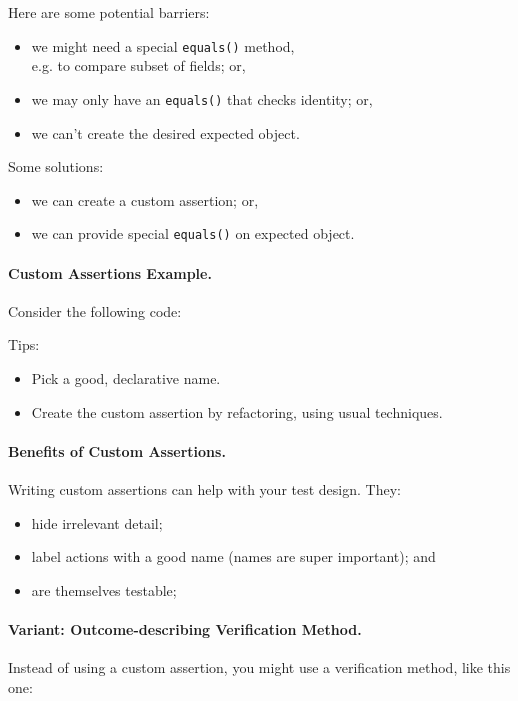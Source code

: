 \documentclass[11pt]{article}
\newenvironment{itemizep}{
 \begin{itemize}
  \setlength{\itemsep}{0pt}
  \setlength{\parsep}{3pt}
  \setlength{\topsep}{3pt}
  \setlength{\partopsep}{0pt}
  \setlength{\leftmargin}{1.5em}
  \setlength{\labelwidth}{1em}
  \setlength{\labelsep}{0.5em} }
 {\end{itemize}}
\begin{document}
Here are some potential barriers: 
\begin{itemizep}
\item we might need a special {\tt equals()} method, \\
  e.g. to compare subset of fields; or,
\item we may only have an {\tt equals()} that checks identity; or,
\item we can't create the desired expected object.
\end{itemizep}

Some solutions:
\begin{itemizep}
\item we can create a custom assertion; or,
\item we can provide special {\tt equals()} on expected object.
\end{itemizep}

\paragraph{Custom Assertions Example.} Consider the
following code:

Tips:
\begin{itemizep}
\item Pick a good, declarative name.
\item Create the custom assertion by refactoring, using usual techniques.
\end{itemizep}

\paragraph{Benefits of Custom Assertions.}
Writing custom assertions can help with your test design. They:
\begin{itemizep}
  \item hide irrelevant detail;
  \item label actions with a good name (names are super important); and
  \item are themselves testable;
\end{itemizep}

\paragraph{Variant: Outcome-describing Verification Method.}
Instead of using a custom assertion, you might use a verification
method, like this one:
\end{document}
